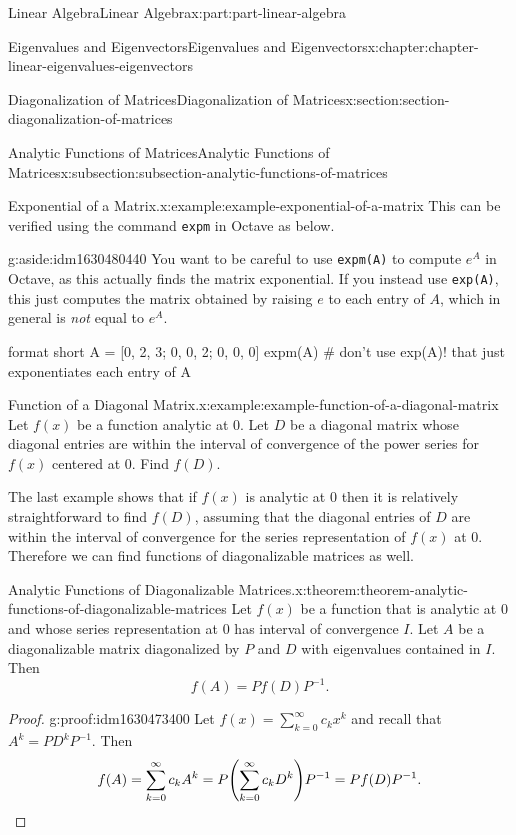 \documentclass[twoside,10pt,]{book}
\newcommand{\mono}[1]{\texttt{#1}}
\numberwithin{equation}{part}
\newcommand{\qedhere}{\relax}
\begin{document}
\begin{partptx}{Linear Algebra}{}{Linear Algebra}{}{}{x:part:part-linear-algebra}
\begin{chapterptx}{Eigenvalues and Eigenvectors}{}{Eigenvalues and Eigenvectors}{}{}{x:chapter:chapter-linear-eigenvalues-eigenvectors}
\begin{sectionptx}{Diagonalization of Matrices}{}{Diagonalization of Matrices}{}{}{x:section:section-diagonalization-of-matrices}
\begin{subsectionptx}{Analytic Functions of Matrices}{}{Analytic Functions of Matrices}{}{}{x:subsection:subsection-analytic-functions-of-matrices}
\begin{example}{Exponential of a Matrix.}{x:example:example-exponential-of-a-matrix}
This can be verified using the command \mono{expm} in Octave as below. \begin{aside}{}{g:aside:idm1630480440}%
You want to be careful to use \mono{expm(A)} to compute \(e^A\) in Octave, as this actually finds the matrix exponential. If you instead use \mono{exp(A)}, this just computes the matrix obtained by raising \(e\) to each entry of \(A\), which in general is \emph{not} equal to \(e^A\).%
\end{aside}
%
\end{example}
\begin{sageinput}
format short
A = [0, 2, 3; 0, 0, 2; 0, 0, 0]
expm(A) # don't use exp(A)! that just exponentiates each entry of A
\end{sageinput}
\begin{example}{Function of a Diagonal Matrix.}{x:example:example-function-of-a-diagonal-matrix}%
Let \(f(x)\) be a function analytic at \(0\). Let \(D\) be a diagonal matrix whose diagonal entries are within the interval of convergence of the power series for \(f(x)\) centered at \(0\). Find \(f(D)\).%
\end{example}
The last example shows that if \(f(x)\) is analytic at \(0\) then it is relatively straightforward to find \(f(D)\), assuming that the diagonal entries of \(D\) are within the interval of convergence for the series representation of \(f(x)\) at \(0\). Therefore we can find functions of diagonalizable matrices as well.%
\begin{theorem}{Analytic Functions of Diagonalizable Matrices.}{}{x:theorem:theorem-analytic-functions-of-diagonalizable-matrices}%
Let \(f(x)\) be a function that is analytic at \(0\) and whose series representation at \(0\) has interval of convergence \(I\). Let \(A\) be a diagonalizable matrix diagonalized by \(P\) and \(D\) with eigenvalues contained in \(I\). Then%
\begin{equation*}
f(A) = Pf(D)P^{-1}\text{.}
\end{equation*}
%
\end{theorem}
\begin{proof}{}{g:proof:idm1630473400}
Let \(f(x) = \sum_{k=0}^{\infty}c_k x^k\) and recall that \(A^k = PD^kP^{-1}\). Then%
\begin{equation*}
f(A) = \sum_{k=0}^{\infty}c_kA^k = P\qty(\sum_{k=0}^{\infty}c_k D^k)P^{-1} = Pf(D)P^{-1}\text{.}\qedhere
\end{equation*}
%
\end{proof}

\end{subsectionptx}
\end{sectionptx}
\end{chapterptx}
\end{partptx}
\end{document}
